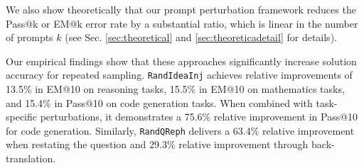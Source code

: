 We also show theoretically that our prompt perturbation framework reduces the Pass@k or EM@k error rate by a substantial ratio, which is linear in the number of prompts $k$ (see Sec. \ref{sec:theoretical} and \ref{sec:theoreticadetail} for details). 

Our empirical findings show that these approaches significantly increase solution accuracy for repeated sampling. 
\texttt{RandIdeaInj} achieves relative improvements of 13.5\% in EM@10 on reasoning tasks, 15.5\% in EM@10 on mathematics tasks, and 15.4\% in Pass@10 on code generation tasks. When combined with task-specific perturbations, it demonstrates a 75.6\% relative improvement in Pass@10 for code generation. Similarly, \texttt{RandQReph} delivers a 63.4\% relative improvement when restating the question and 29.3\% relative improvement through back-translation.
